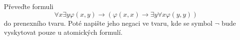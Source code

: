 \subsubsection{}
Převeďte formuli
$$\forall x \exists y \varphi (x,y) \rightarrow ( \varphi (x,x) \rightarrow
\exists y \forall x \varphi (y,y))$$
do prenexního tvaru. Poté napište jeho negaci ve tvaru, kde se symbol $\neg$
  bude vyskytovat pouze u atomických formulí.
